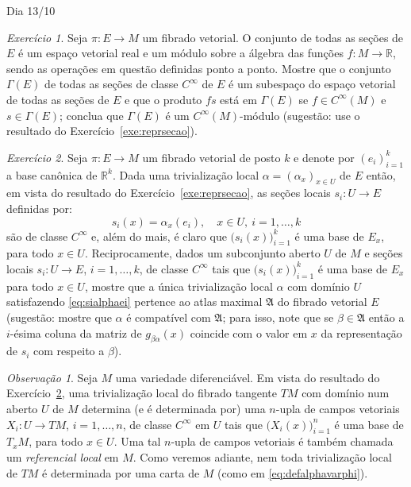 \documentclass[oneside,11pt]{amsart}
\newcommand{\R}{\mathds R}
\theoremstyle{remark}\newtheorem{exercise}{Exercício}[section]
\theoremstyle{plain}\newtheorem{teo}{Teorema}[section]
\theoremstyle{plain}\newtheorem{lem}[teo]{Lema}
\theoremstyle{plain}\newtheorem{prop}[teo]{Proposição}
\theoremstyle{definition}\newtheorem{defin}[teo]{Definição}
\theoremstyle{remark}\newtheorem{rem}[teo]{Observação}
\theoremstyle{definition}\newtheorem{example}[teo]{Exemplo}
\numberwithin{equation}{section}
\begin{document}
\begin{section}{Dia 13/10}
\begin{exercise}
Seja $\pi:E\to M$ um fibrado vetorial. O conjunto de todas as seções de $E$ é um espaço vetorial real e um módulo
sobre a álgebra das funções $f:M\to\R$, sendo as operações em questão definidas ponto a ponto. Mostre que o conjunto $\Gamma(E)$
de todas as seções de classe $C^\infty$ de $E$ é um subespaço do espaço vetorial de todas as seções de $E$ e que o produto $fs$ está em $\Gamma(E)$
se $f\in C^\infty(M)$ e $s\in\Gamma(E)$; conclua que $\Gamma(E)$ é um $C^\infty(M)$-módulo (sugestão: use o resultado do Exercício~\ref{exe:reprsecao}).
\end{exercise}

\begin{exercise}\label{exe:trivsecoes}
Seja $\pi:E\to M$ um fibrado vetorial de posto $k$ e denote por $(e_i)_{i=1}^k$ a base canônica de $\R^k$. Dada uma trivialização local $\alpha=(\alpha_x)_{x\in U}$
de $E$ então, em vista do resultado do Exercício~\ref{exe:reprsecao}, as seções locais $s_i:U\to E$ definidas por:
\begin{equation}\label{eq:sialphaei}
s_i(x)=\alpha_x(e_i),\quad x\in U,\ i=1,\ldots,k
\end{equation}
são de classe $C^\infty$ e, além do mais, é claro que
$\big(s_i(x)\big)_{i=1}^k$ é uma base de $E_x$, para todo $x\in U$. Reciprocamente, dados um subconjunto aberto $U$ de $M$ e seções locais $s_i:U\to E$, $i=1,\ldots,k$,
de classe $C^\infty$ tais que $\big(s_i(x)\big)_{i=1}^k$ é uma base de $E_x$ para todo $x\in U$, mostre que a única
trivialização local $\alpha$ com domínio $U$ satisfazendo \eqref{eq:sialphaei} pertence ao atlas maximal $\mathfrak A$ do fibrado vetorial $E$ (sugestão:
mostre que $\alpha$ é compatível com $\mathfrak A$; para isso, note que se $\beta\in\mathfrak A$ então a $i$-ésima coluna da matriz de $g_{\beta\alpha}(x)$
coincide com o valor em $x$ da representação de $s_i$ com respeito a $\beta$).
\end{exercise}

\begin{rem}
Seja $M$ uma variedade diferenciável. Em vista do resultado do Exercício~\ref{exe:trivsecoes}, uma trivialização local do fibrado tangente $TM$ com domínio
num aberto $U$ de $M$ determina (e é determinada por) uma $n$-upla de campos vetoriais $X_i:U\to TM$, $i=1,\ldots,n$, de classe $C^\infty$ em $U$ tais que
$\big(X_i(x)\big)_{i=1}^n$ é uma base de $T_xM$, para todo $x\in U$. Uma tal $n$-upla de campos vetoriais é também chamada um {\em referencial local\/}
em $M$. Como veremos adiante, nem toda trivialização local de $TM$ é determinada por
uma carta de $M$ (como em \eqref{eq:defalphavarphi}).
\end{rem}


\end{section}
\end{document}
